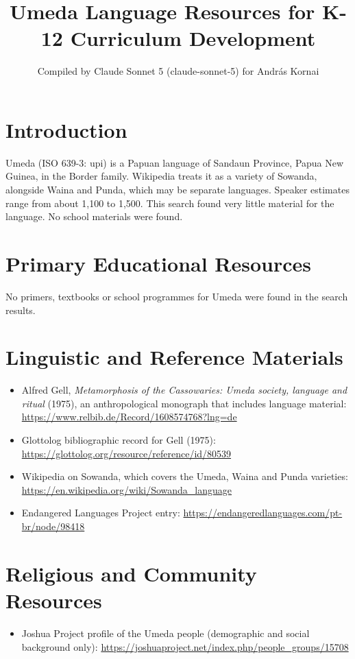 \documentclass[12pt]{article}
\title{Umeda Language Resources for K-12 Curriculum Development}
\author{Compiled by Claude Sonnet 5 (claude-sonnet-5) for Andr\'as Kornai}
\date{}
\begin{document}
\maketitle

\section{Introduction}
Umeda (ISO 639-3: upi) is a Papuan language of Sandaun Province, Papua New Guinea, in the Border family. Wikipedia treats it as a variety of Sowanda, alongside Waina and Punda, which may be separate languages. Speaker estimates range from about 1,100 to 1,500. This search found very little material for the language. No school materials were found.

\section{Primary Educational Resources}
No primers, textbooks or school programmes for Umeda were found in the search results.

\section{Linguistic and Reference Materials}
\begin{itemize}
\item Alfred Gell, \emph{Metamorphosis of the Cassowaries: Umeda society, language and ritual} (1975), an anthropological monograph that includes language material: \url{https://www.relbib.de/Record/1608574768?lng=de}
\item Glottolog bibliographic record for Gell (1975): \url{https://glottolog.org/resource/reference/id/80539}
\item Wikipedia on Sowanda, which covers the Umeda, Waina and Punda varieties: \url{https://en.wikipedia.org/wiki/Sowanda_language}
\item Endangered Languages Project entry: \url{https://endangeredlanguages.com/pt-br/node/98418}
\end{itemize}

\section{Religious and Community Resources}
\begin{itemize}
\item Joshua Project profile of the Umeda people (demographic and social background only): \url{https://joshuaproject.net/index.php/people_groups/15708}
\end{itemize}
\end{document}
